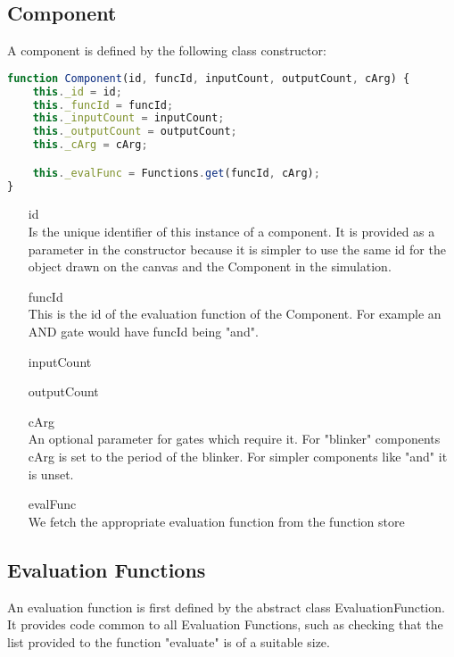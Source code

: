 \subsection{Component}
A component is defined by the following class constructor:

\begin{lstlisting}[language=JavaScript]
function Component(id, funcId, inputCount, outputCount, cArg) {
    this._id = id;
    this._funcId = funcId;
    this._inputCount = inputCount;
    this._outputCount = outputCount;
    this._cArg = cArg;

    this._evalFunc = Functions.get(funcId, cArg);
}
\end{lstlisting}

\begin{itemize}
	\item[id] \hfill \\ 
	Is the unique identifier of this instance of a component. It is provided as a parameter in the constructor because it is simpler to use the same id for the object drawn on the canvas and the Component in the simulation.
	\item[funcId] \hfill \\ 
	This is the id of the evaluation function of the Component. For example an AND gate would have funcId being "and".
	\item[inputCount]
	\item[outputCount]
	\item[cArg] \hfill \\ 
	An optional parameter for gates which require it. For "blinker" components cArg is set to the period of the blinker. For simpler components like "and" it is unset.
	\item[evalFunc] \hfill \\ 
	We fetch the appropriate evaluation function from the function store
\end{itemize}

\subsection{Evaluation Functions}
An evaluation function is first defined by the abstract class EvaluationFunction. It provides code common to all Evaluation Functions, such as checking that the list provided to the function "evaluate" is of a suitable size.

